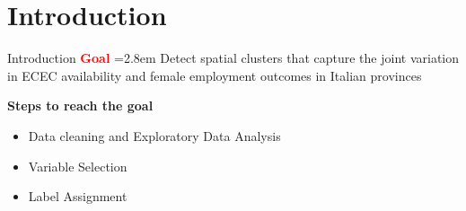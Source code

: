 \section{Introduction} %
\begin{frame}{Introduction} %
\vspace{0.5 cm}
\noindent
\textbf{\textcolor{red}{Goal}}\hspace{0.5em}%
\hangindent=2.8em
Detect spatial clusters that capture the joint variation in ECEC 
availability and female employment outcomes in Italian provinces

\vspace{0.8 cm}

\textbf{Steps to reach the goal}
\begin{itemize}
    \item Data cleaning and Exploratory Data Analysis
    \item Variable Selection
    \item Label Assignment
\end{itemize}
    
\end{frame}